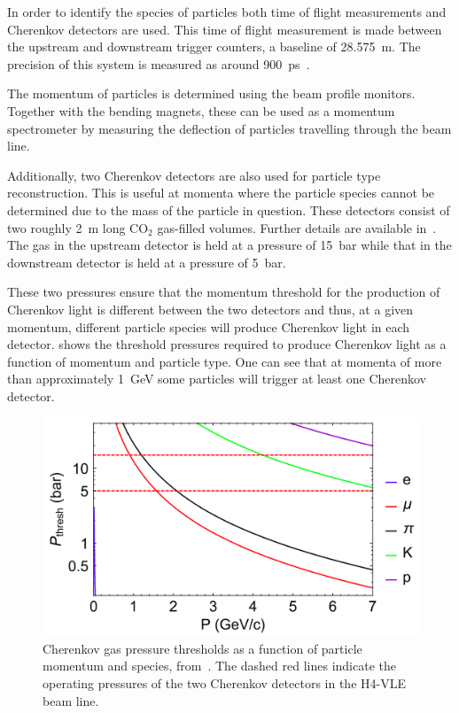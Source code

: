In order to identify the species of particles both time of flight measurements and Cherenkov detectors are used.
This time of flight measurement is made between the upstream and downstream trigger counters, a baseline of \SI{28.575}{\m}.
The precision of this system is measured as around \SI{900}{\pico\second}~\cite{boothBeamLineInstr}.

The momentum of particles is determined using the beam profile monitors.
Together with the bending magnets, these can be used as a momentum spectrometer by measuring the deflection of particles travelling through the beam line.

Additionally, two Cherenkov detectors are also used for particle type reconstruction.
This is useful at momenta where the particle species cannot be determined due to the mass of the particle in question.
These detectors consist of two roughly \SI{2}{\m} long $\text{CO}_{2}$ gas-filled volumes. Further details are available in~\cite{vleCherenkov}.
The gas in the upstream detector is held at a pressure of \SI{15}{\bar} while that in the downstream detector is held at a pressure of \SI{5}{\bar}.

These two pressures ensure that the momentum threshold for the production of Cherenkov light is different between the two detectors and thus, at a given momentum, different particle species will produce Cherenkov light in each detector.
 shows the threshold pressures required to produce Cherenkov light as a function of momentum and particle type.
One can see that at momenta of more than approximately \SI{1}{\GeV} some particles will trigger at least one Cherenkov detector.

\begin{figure}[h]
	\centering
	\includegraphics[width=.6\linewidth]{files/figures/protodune_detector/cherenkovThresh}
	\caption[Cherenkov gas pressure thresholds as a function of particle momentum and species]{Cherenkov gas pressure thresholds as a function of particle momentum and species, from~\cite{boothBeamLineInstr}. The dashed red lines indicate the operating pressures of the two Cherenkov detectors in the H4-VLE beam line.}
	\label{fig:cherenkovThresh}
\end{figure}

